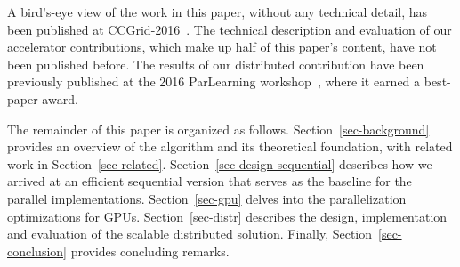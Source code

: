 \begin{comment}
Further, by cataloguing and accounting for the various load and store
operations, we identified the highest priority locations of data reuse. In
order to circumvent the unclear optimization landscape, we developed an
effective kernel code generation mechanism that explores the benefits of
exploiting all permutations of the available optimization opportunities. These
optimizations include caching in shared memory, caching in the register file,
loop unrolling and explicit vectorization.
\end{comment}

A bird's-eye view of the work in this paper, without any technical detail, has been
published at CCGrid-2016~\cite{10.1109/CCGrid.2016.98}. The technical description and
evaluation of our accelerator contributions, which make up half of this paper's
content, have not been published before.
The results of our distributed contribution
have been previously published at the 2016 ParLearning
workshop~\cite{DBLP:conf/ipps/El-HelwHLAWB16}, where it earned a best-paper
award.

The remainder of this paper is organized as follows.
Section~\ref{sec-background} provides an overview of the
algorithm and its theoretical foundation, with related work in
Section~\ref{sec-related}. Section~\ref{sec-design-sequential} describes how we
arrived at an efficient sequential version that serves as the baseline for the
parallel implementations. Section~\ref{sec-gpu} delves
into the parallelization optimizations for GPUs.
Section~\ref{sec-distr} describes the design, implementation and evaluation of
the scalable distributed solution. Finally, Section~\ref{sec-conclusion}
provides concluding remarks.






